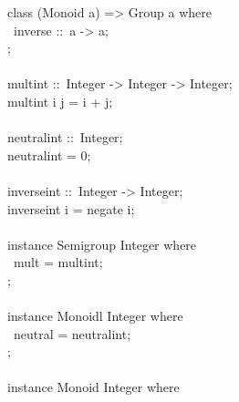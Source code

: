 \begin{isabellebody}
\begin{isamarkuptext}
\hspace*{0pt}class (Monoid a) => Group a where {}\\
\hspace*{0pt} ~inverse ::~a -> a;\\
\hspace*{0pt}{\char125};\\
\hspace*{0pt}\\
\hspace*{0pt}mult{}int ::~Integer -> Integer -> Integer;\\
\hspace*{0pt}mult{}int i j = i + j;\\
\hspace*{0pt}\\
\hspace*{0pt}neutral{}int ::~Integer;\\
\hspace*{0pt}neutral{}int = 0;\\
\hspace*{0pt}\\
\hspace*{0pt}inverse{}int ::~Integer -> Integer;\\
\hspace*{0pt}inverse{}int i = negate i;\\
\hspace*{0pt}\\
\hspace*{0pt}instance Semigroup Integer where {}\\
\hspace*{0pt} ~mult = mult{}int;\\
\hspace*{0pt}{\char125};\\
\hspace*{0pt}\\
\hspace*{0pt}instance Monoidl Integer where {}\\
\hspace*{0pt} ~neutral = neutral{}int;\\
\hspace*{0pt}{\char125};\\
\hspace*{0pt}\\
\hspace*{0pt}instance Monoid Integer where {}\\

\end{isamarkuptext}
\end{isabellebody}
